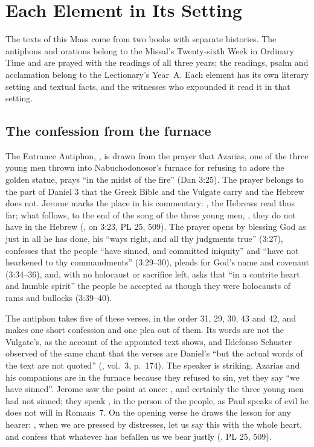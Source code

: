 \section{Each Element in Its Setting}
\label{sec:each-element}

The texts of this Mass come from two books with separate histories. The
antiphons and orations belong to the Missal's Twenty-sixth Week in Ordinary
Time and are prayed with the readings of all three years; the readings, psalm
and acclamation belong to the Lectionary's Year~A. Each element has its own
literary setting and textual facts, and the witnesses who expounded it read it
in that setting.

\subsection{The confession from the furnace}

The Entrance Antiphon, , is drawn from
the prayer that Azarias, one of the three young men thrown into
Nabuchodonosor's furnace for refusing to adore the golden statue, prays ``in
the midst of the fire'' (Dan 3:25). The prayer belongs to the part of Daniel 3
that the Greek Bible and the Vulgate carry and the Hebrew does not. Jerome
marks the place in his commentary: , the Hebrews read thus far; what follows, to the end of the song of the
three young men, , they do not have in the
Hebrew (, on 3:23, PL 25, 509). The prayer opens by blessing
God as just in all he has done, his ``ways right, and all thy judgments
true'' (3:27), confesses that the people ``have sinned, and committed
iniquity'' and ``have not hearkened to thy commandments'' (3:29--30), pleads
for God's name and covenant (3:34--36), and, with no holocaust or sacrifice
left, asks that ``in a contrite heart and humble spirit'' the people be
accepted as though they were holocausts of rams and bullocks (3:39--40).

The antiphon takes five of these verses, in the order 31, 29, 30, 43 and 42,
and makes one short confession and one plea out of them. Its words are not the
Vulgate's, as the account of the appointed text shows, and Ildefonso Schuster
observed of the same chant that the verses are Daniel's ``but the actual words
of the text are not quoted'' (, vol.~3, p.~174). The
speaker is striking. Azarias and his companions are in the furnace because
they refused to sin, yet they say ``we have sinned''. Jerome saw the point at
once: , and certainly the three
young men had not sinned; they speak , in the person
of the people, as Paul speaks of evil he does not will in Romans~7. On the
opening verse he draws the lesson for any hearer: , when we are pressed by distresses,
let us say this with the whole heart, and confess that whatever has befallen
us we bear justly (, PL 25, 509).

